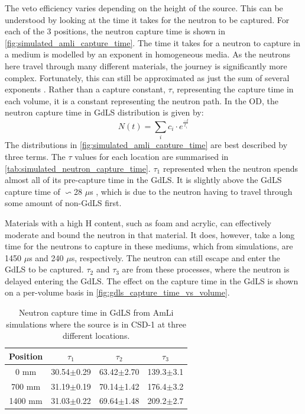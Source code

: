 \par
The veto efficiency varies depending on the height of the source.
This can be understood by looking at the time it takes for the neutron to be captured.
For each of the 3 positions, the neutron capture time is shown in \autoref{fig:simulated_amli_capture_time}.
The time it takes for a neutron to capture in a medium is modelled by an exponent in homogeneous media.
As the neutrons here travel through many different materials, the journey is significantly more complex.
Fortunately, this can still be approximated as just the sum of several exponents \cite{Dayabay_neutron_capture_fit_ref}.
Rather than a capture constant, $\tau$, representing the capture time in each volume, it is a constant representing the neutron path.
In the OD, the neutron capture time in GdLS distribution is given by:
\begin{equation}
    N(t) = \sum_{i} c_i \cdot e^{\frac{-t}{t_i}}
\label{eq:neutron_capture_time}
\end{equation}
The distributions in \autoref{fig:simulated_amli_capture_time} are best described by three terms.
The $\tau$ values for each location are summarised in \autoref{tab:simulated_neutron_capture_time}.
$\tau_1$ represented when the neutron spends almost all of its pre-capture time in the GdLS.
It is slightly above the GdLS capture time of $\backsim$28 $\mu$s \cite{ucsb_gdls_dicebox_simulations_ref}, which is due to the neutron having to travel through some amount of non-GdLS first.
\par
Materials with a high H content, such as foam and acrylic, can effectively moderate and bound the neutron in that material.
It does, however, take a long time for the neutrons to capture in these mediums, which from simulations, are 1450 $\mu$s and 240 $\mu$s, respectively.
The neutron can still escape and enter the GdLS to be captured.
$\tau_2$ and $\tau_3$ are from these processes, where the neutron is delayed entering the GdLS.
The effect on the capture time in the GdLS is shown on a per-volume basis in \autoref{fig:gdls_capture_time_vs_volume}.

\begin{table}[]
    \centering
    \begin{tabular}{c|c|c|c}
        Position  &  $\tau_1$      & $\tau_2$       & $\tau_3$        \\ \hline
        0 mm      & 30.54$\pm$0.29 & 63.42$\pm$2.70 & 139.3$\pm$3.1   \\ 
        700 mm    & 31.19$\pm$0.19 & 70.14$\pm$1.42 & 176.4$\pm$3.2   \\
        1400 mm   & 31.03$\pm$0.22 & 69.64$\pm$1.48 & 209.2$\pm$2.7         
    \end{tabular}
    \caption{Neutron capture time in GdLS from AmLi simulations where the source is in CSD-1 at three different locations.}
    \label{tab:simulated_neutron_capture_time}
\end{table}

